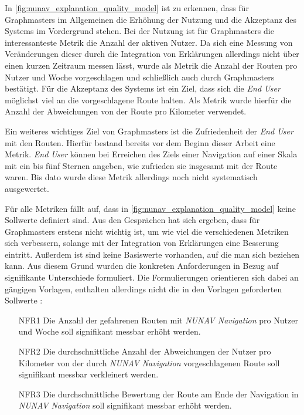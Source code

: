 In \autoref{fig:nunav_explanation_quality_model} ist zu erkennen, dass für Graphmasters im Allgemeinen die Erhöhung der Nutzung und die Akzeptanz des Systems im Vordergrund stehen. Bei der Nutzung ist für Graphmasters die interessanteste Metrik die Anzahl der aktiven Nutzer. Da sich eine Messung von Veränderungen dieser durch die Integration von Erklärungen allerdings nicht über einen kurzen Zeitraum messen lässt, wurde  als Metrik die Anzahl der Routen pro Nutzer und Woche vorgeschlagen und schließlich auch durch Graphmasters bestätigt. Für die Akzeptanz des Systems ist ein Ziel, dass sich die \textit{End User} möglichst viel an die vorgeschlagene Route halten. Als Metrik wurde hierfür die Anzahl der Abweichungen von der Route pro Kilometer verwendet.

Ein weiteres wichtiges Ziel von Graphmasters ist die Zufriedenheit der \textit{End User} mit den Routen. Hierfür bestand bereits vor dem Beginn dieser Arbeit eine Metrik. \textit{End User} können bei Erreichen des Ziels einer Navigation auf einer Skala mit ein bis fünf Sternen angeben, wie zufrieden sie insgesamt mit der Route waren. Bis dato wurde diese Metrik allerdings noch nicht systematisch ausgewertet.

Für alle Metriken fällt auf, dass in \autoref{fig:nunav_explanation_quality_model} keine Sollwerte definiert sind. Aus den Gesprächen hat sich ergeben, dass für Graphmasters erstens nicht wichtig ist, um wie viel die verschiedenen Metriken sich verbessern, solange mit der Integration von Erklärungen eine Besserung eintritt. Außerdem ist sind keine Basiswerte vorhanden, auf die man sich beziehen kann. Aus diesem Grund wurden die konkreten Anforderungen in Bezug auf signifikante Unterschiede formuliert. Die Formulierungen orientieren sich dabei an gängigen Vorlagen, enthalten allerdings nicht die in den Vorlagen geforderten Sollwerte \cite{rajnish2010quality, wiegers1999writing, alexander2002writing}:

\begin{enumerate}
    \item [NFR1] Die Anzahl der gefahrenen Routen mit \textit{NUNAV Navigation} pro Nutzer und Woche soll signifikant messbar erhöht werden.
    \item [NFR2] Die durchschnittliche Anzahl der Abweichungen der Nutzer pro Kilometer von der durch \textit{NUNAV Navigation} vorgeschlagenen Route soll signifikant messbar verkleinert werden.
    \item [NFR3] Die durchschnittliche Bewertung der Route am Ende der Navigation in \textit{NUNAV Navigation} soll signifikant messbar erhöht werden.
\end{enumerate}

